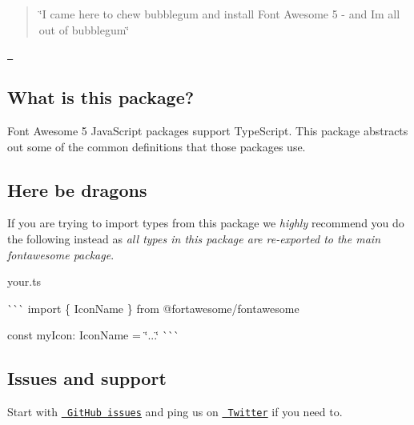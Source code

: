 \begin{quote}
\char`\"{}\+I came here to chew bubblegum and install Font Awesome 5 -\/ and I\textquotesingle{}m all out of bubblegum\char`\"{} \end{quote}


\href{https://www.npmjs.com/package/@fortawesome/fontawesome-common-types}{\texttt{ }}

\subsection*{What is this package?}

Font Awesome 5 Java\+Script packages support Type\+Script. This package abstracts out some of the common definitions that those packages use.

\subsection*{Here be dragons}

If you are trying to import types from this package we {\itshape highly} recommend you do the following instead as {\itshape all types in this package are re-\/exported to the main fontawesome package}.

your.\+ts

\`{}\`{}\`{} import \{ Icon\+Name \} from {\ttfamily @fortawesome/fontawesome}

const my\+Icon\+: Icon\+Name = \char`\"{}...\char`\"{} \`{}\`{}\`{}

\subsection*{Issues and support}

Start with \href{https://github.com/FortAwesome/Font-Awesome/issues}{\texttt{ Git\+Hub issues}} and ping us on \href{https://twitter.com/fontawesome}{\texttt{ Twitter}} if you need to. 
